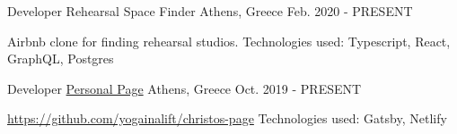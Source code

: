 

\begin{cventries}

  \cventry
	{Developer} %
	{Rehearsal Space Finder} %
	{Athens, Greece} %
	{Feb. 2020 - PRESENT} %
	{
	  \begin{cvitems} %
		\item {
			Airbnb clone for finding rehearsal studios.
			\newline
			Technologies used: Typescript, React, GraphQL, Postgres
		}
	  \end{cvitems}
	}

  \cventry
    {Developer} %
    {\href{https://christos.page}{Personal Page}} %
    {Athens, Greece} %
    {Oct. 2019 - PRESENT} %
    {
      \begin{cvitems} %
       \item {\url{https://github.com/yogainalift/christos-page}
       	\newline
       	Technologies used: Gatsby, Netlify
       }
      \end{cvitems}
    }


\end{cventries}
